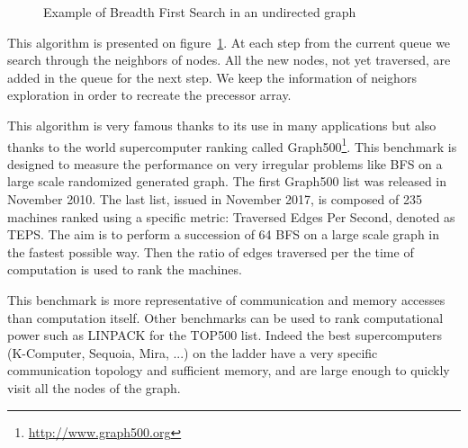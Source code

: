 \begin{figure}
\caption{Example of Breadth First Search in an undirected graph}
\label{fig:part2_chap3:BFS}
\end{figure}


This algorithm is presented on figure~\ref{fig:part2_chap3:BFS}.
At each step from the current queue we search through the neighbors of nodes. 
All the new nodes, not yet traversed, are added in the queue for the next step.
We keep the information of neighors exploration in order to recreate the precessor array. 

This algorithm is very famous thanks to its use in many applications but also thanks to the world supercomputer ranking called Graph500\footnote{\url{http://www.graph500.org}}.
This benchmark is designed to measure the performance on very irregular problems like BFS on a large scale randomized generated graph. 
The first Graph500 list was released in November 2010.
The last list, issued in November 2017, is composed of 235 machines ranked using a specific metric: Traversed Edges Per Second, denoted as TEPS. 
The aim is to perform a succession of 64 BFS on a large scale graph in the fastest possible way.
Then the ratio of edges traversed per the time of computation is used to rank the machines.

This benchmark is more representative of communication and memory accesses than computation itself. 
Other benchmarks can be used to rank computational power such as LINPACK for the TOP500 list.
Indeed the best supercomputers (K-Computer, Sequoia, Mira, ...) on the ladder have a very specific communication topology and sufficient memory, and are large enough to quickly visit all the nodes of the graph. 

